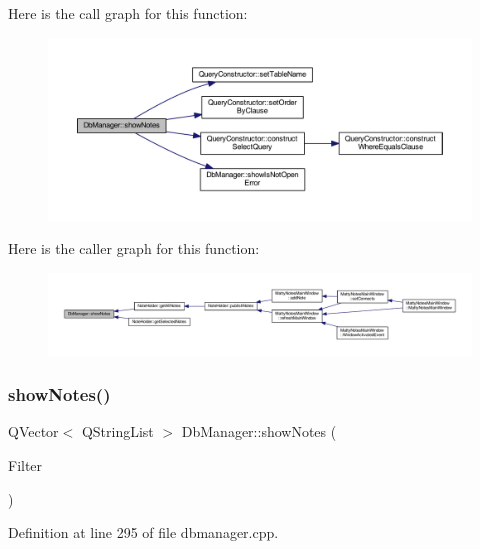 Here is the call graph for this function\+:
\nopagebreak
\begin{figure}[H]
\begin{center}
\leavevmode
\includegraphics[width=350pt]{classDbManager_a67826fcd32d3921d1d1ae32ff3e9ce5d_cgraph}
\end{center}
\end{figure}
Here is the caller graph for this function\+:
\nopagebreak
\begin{figure}[H]
\begin{center}
\leavevmode
\includegraphics[width=350pt]{classDbManager_a67826fcd32d3921d1d1ae32ff3e9ce5d_icgraph}
\end{center}
\end{figure}
\hypertarget{classDbManager_a6e04515110041436021b5ee0f068eda2}{}\label{classDbManager_a6e04515110041436021b5ee0f068eda2} 
\subsubsection{\texorpdfstring{show\+Notes()}{showNotes()}\hspace{0.1cm}{\footnotesize\ttfamily [2/2]}}
{\footnotesize\ttfamily Q\+Vector$<$ Q\+String\+List $>$ Db\+Manager\+::show\+Notes (\begin{DoxyParamCaption}\item[{Q\+Map$<$ Q\+String, Q\+String $>$ \&}]{Filter }\end{DoxyParamCaption})\hspace{0.3cm}{\ttfamily [static]}}



Definition at line 295 of file dbmanager.\+cpp.


